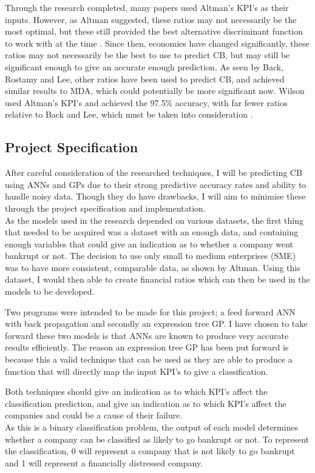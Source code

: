 \documentclass[11pt]{article}
\begin{document}
Through the research completed, many papers used Altman's KPI's as their inputs. However, as Altman suggested, these ratios may not necessarily be the most optimal, but these still provided the best alternative discriminant function to work with at the time \cite{?}. Since then, economies have changed significantly, these ratios may not necessarily be the best to use to predict CB, but may still be significant enough to give an accurate enough prediction. As seen by Back, Rostamy and Lee\cite{'''}, other ratios have been used to predict CB, and achieved similar results to MDA, which could potentially be more significant now. Wilson used Altman's KPI's and achieved the 97.5\% accuracy, with far fewer ratios relative to Back and Lee, which must be taken into consideration \cite{?}.
\subsection{Project Specification}
After careful consideration of the researched techniques, I will be predicting CB using ANNs and GPs due to their strong predictive accuracy rates and ability to handle noisy data. Though they do have drawbacks, I will aim to minimise these through the project specification and implementation.\\

As the models used in the research depended on various datasets, the first thing that needed to be acquired was a dataset with an enough data, and containing enough variables that could give an indication as to whether a company went bankrupt or not. The decision to use only small to medium enterprises (SME) was to have more consistent, comparable data, as shown by Altman. Using this dataset, I would then able to create financial ratios which can then be used in the models to be developed. 

Two programs were intended to be made for this project; a feed forward ANN with back propagation and secondly an expression tree GP.  I have chosen to take forward these two models is that ANNs are known to produce very accurate results efficiently. The reason an expression tree GP has been put forward is because this a valid technique that can be used as they are able to produce a function that will directly map the input KPI's to give a classification.

Both techniques should give an indication as to which KPI's affect the classification prediction, and give an indication as to which KPI's affect the companies and could be a cause of their failure.  \\
As this is a binary classification problem, the output of each model determines whether a company can be classified as likely to go bankrupt or not. To represent the classification,  0 will represent a company that is not likely to go bankrupt  and 1 will represent a financially distressed company.
\end{document}
